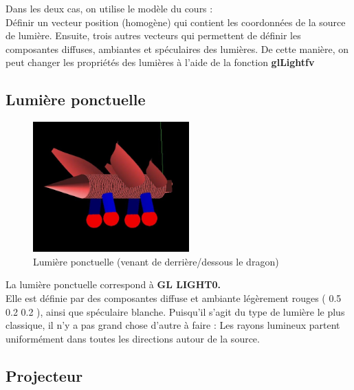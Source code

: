 \documentclass{article}
\begin{document}
Dans les deux cas, on utilise le modèle du cours :\\Définir un vecteur position (homogène) qui contient les coordonnées de la source de lumière. Ensuite, trois autres vecteurs qui permettent de définir les composantes diffuses, ambiantes et spéculaires des lumières. De cette manière, on peut changer les propriétés des lumières à l'aide de la fonction \textbf{glLightfv}


\subsection{Lumière ponctuelle}

\begin{figure}[!htb]
	\centering
    	\includegraphics[height=5cm]{./assets/lumiere_ponctuelle.jpg}
    	\caption{Lumière ponctuelle (venant de derrière/dessous le dragon)}
    	\label{fig:lumiere_ponctuelle}
\end{figure}

La lumière ponctuelle correspond à \textbf{GL LIGHT0.}\\
Elle est définie par des composantes diffuse et ambiante légèrement rouges ( 0.5 0.2 0.2 ), ainsi que spéculaire blanche. Puisqu'il s'agit du type de lumière le plus classique, il n'y a pas grand chose d'autre à faire : Les rayons lumineux partent uniformément dans toutes les directions autour de la source.

\subsection{Projecteur}
\end{document}
